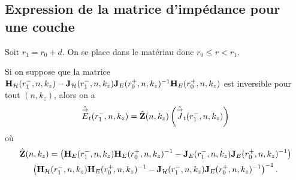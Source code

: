 

  \subsection{Expression de la matrice d'impédance pour une couche}

    Soit \(r_1 = r_0 + d\). On se place dans le matériau donc \(r_0 \le r < r_1\).

    \begin{prop}
      Si on suppose que la matrice 
      \newline
      \(\mathbf{H}_{\mathcal{H}}(r_1^-,n,k_z) - \mathbf{J}_{\mathcal{H}}(r_1^-,n,k_z)\mathbf{J}_{E}(r_0^+,n,k_z)^{-1}\mathbf{H}_{E}(r_0^+,n,k_z)\) est inversible pour tout \((n,k_z)\), alors on a 
      \begin{equation*}
        \hat {{\overset{\rightarrow}{E}}}_t(r_1^-,n,k_z) = \hat {\mathbf{Z}}(n,k_z) \left(\hat{{\overset{\rightarrow}{J}}}_t(r_1^-,n,k_z)\right)
      \end{equation*}
      où
      \begin{multline*}
        \hat {\mathbf{Z}}(n,k_z) =
        \left(\mathbf{H}_{E}(r_1^-,n,k_z)\mathbf{H}_{E}(r_0^+,n,k_z)^{-1} - \mathbf{J}_{E}(r_1^-,n,k_z)\mathbf{J}_{E}(r_0^+,n,k_z)^{-1}\right)\\
        \left(\mathbf{H}_{\mathcal{H}}(r_1^-,n,k_z)\mathbf{H}_{E}(r_0^+,n,k_z)^{-1} - \mathbf{J}_{\mathcal{H}}(r_1^-,n,k_z)\mathbf{J}_{E}(r_0^+,n,k_z)^{-1}\right)^{-1}.
      \end{multline*}
    \end{prop}

